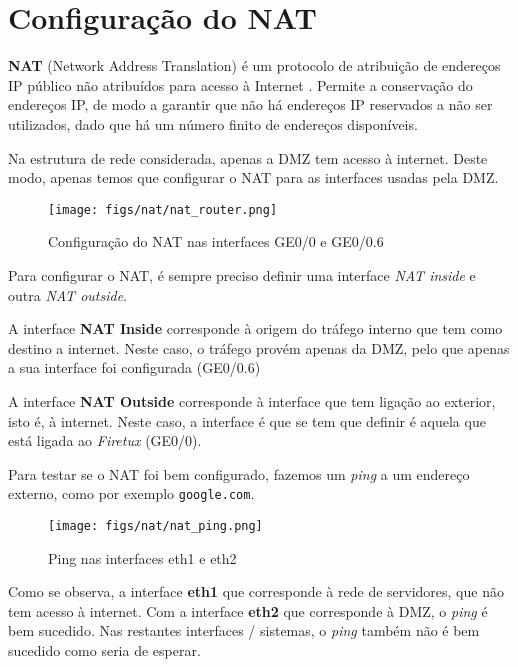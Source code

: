 \chapter{Configuração do NAT} \label{nat}

\textbf{NAT} (Network Address Translation) é um protocolo de atribuição de endereços IP público não atribuídos para acesso à Internet \cite{nat}.
Permite a conservação do endereços IP, de modo a garantir que não há endereços IP reservados a não ser utilizados, dado que há um número finito de endereços disponíveis.

Na estrutura de rede considerada, apenas a DMZ tem acesso à internet.
Deste modo, apenas temos que configurar o NAT para as interfaces usadas pela DMZ.

\begin{figure}[H]
    \centering
    \texttt{[image: figs/nat/nat\_router.png]}
    \caption{Configuração do NAT nas interfaces GE0/0 e GE0/0.6}
    \label{fig:nat_router}
\end{figure}

Para configurar o NAT, é sempre preciso definir uma interface \textit{NAT inside} e outra \textit{NAT outside}.

A interface \textbf{NAT Inside} corresponde à origem do tráfego interno que tem como destino a internet.
Neste caso, o tráfego provém apenas da DMZ, pelo que apenas a sua interface foi configurada (GE0/0.6)

A interface \textbf{NAT Outside} corresponde à interface que tem ligação ao exterior, isto é, à internet.
Neste caso, a interface é que se tem que definir é aquela que está ligada ao \textit{Firetux} (GE0/0).

Para testar se o NAT foi bem configurado, fazemos um \textit{ping} a um endereço externo, como por exemplo \verb|google.com|.

\begin{figure}[H]
    \centering
    \texttt{[image: figs/nat/nat\_ping.png]}
    \caption{Ping nas interfaces eth1 e eth2}
    \label{fig:nat_ping}
\end{figure}

Como se observa, a interface \textbf{eth1} que corresponde à rede de servidores, que não tem acesso à internet.
Com a interface \textbf{eth2} que corresponde à DMZ, o \textit{ping} é bem sucedido.
Nas restantes interfaces / sistemas, o \textit{ping} também não é bem sucedido como seria de esperar.

